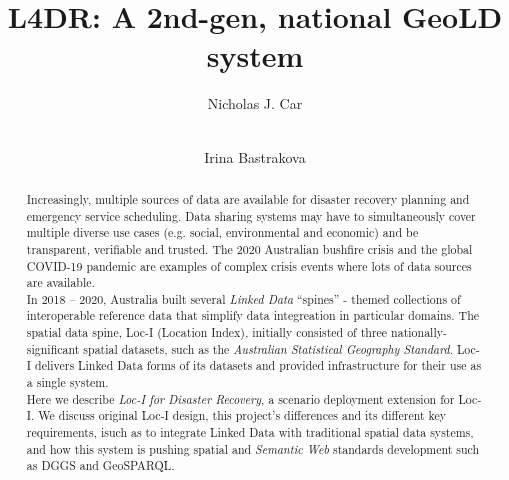 \documentclass[runningheads]{llncs}
\begin{document}
\title{L4DR: A 2nd-gen, national GeoLD system}

\author{
    Nicholas J. Car \and \\
    Irina Bastrakova
}



\maketitle

\begin{abstract}
Increasingly, multiple sources of data are available for disaster recovery planning and emergency service scheduling. Data sharing systems may
have to simultaneously cover multiple diverse use cases (e.g. social, environmental and economic) and be transparent, verifiable and trusted. 
The 2020 Australian bushfire crisis and the global COVID-19 pandemic are examples of complex crisis events where lots of data sources are available.\\

In 2018 – 2020, Australia built several \textit{Linked Data} ``spines'' - themed collections of interoperable reference data that simplify data 
integreation in particular domains. 
The spatial data spine, Loc-I (Location Index), initially consisted of three nationally-significant spatial datasets, such as the \textit{Australian Statistical Geography Standard}. 
Loc-I delivers Linked Data forms of its datasets and provided infrastructure for their use as a single system.\\

Here we describe \textit{Loc-I for Disaster Recovery}, a scenario deployment extension for Loc-I.
We discuss original Loc-I design, this project's differences and its different key requirements, isuch as to integrate Linked Data with traditional
spatial data systems, and how this system is pushing spatial and \textit{Semantic Web} standards development such as DGGS and GeoSPARQL.

\end{abstract}
\end{document}
